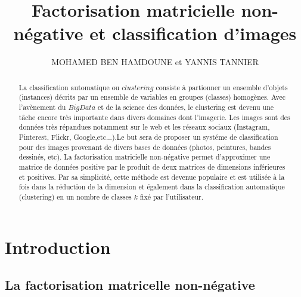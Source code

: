 \documentclass[runningheads]{llncs}
\begin{document}
\title{Factorisation matricielle non-n\'egative et classification d'images}

\author{MOHAMED BEN HAMDOUNE et YANNIS TANNIER}



%
\maketitle              %
%
\begin{abstract}
La classification automatique ou $clustering$ consiste \`a partionner un ensemble d'objets (instances) d\'ecrits par un ensemble de variables en groupes (classes) homog\`enes. Avec l'av\`enement du $Big Data$ et de la science des donn\'ees, le clustering est devenu une t\^ache encore tr\`es importante dans divers domaines dont l'imagerie. Les images sont des donn\'ees tr\`es r\'epandues notamment sur le web et les r\'eseaux sociaux (Instagram, Pinterest, Flickr, Google,etc...).Le but sera de proposer un syst\'eme de classification pour des images provenant de divers bases de donn\'ees (photos, peintures, bandes dessin\'es, etc). La factorisation matricielle non-n\'egative permet d'approximer une matrice de donn\'ees positive par le produit de deux matrices de dimensions inf\'erieures et positives. Par sa simplicit\'e, cette m\'ethode est devenue populaire et est utilis\'ee \`a la fois dans la r\'eduction de la dimension et \'egalement dans la classification automatique (clustering) en un nombre de classes $k$ fix\'e par l'utilisateur. 
\end{abstract}
%
\section{Introduction}
\subsection{La factorisation matricelle non-n\'egative}
\end{document}
